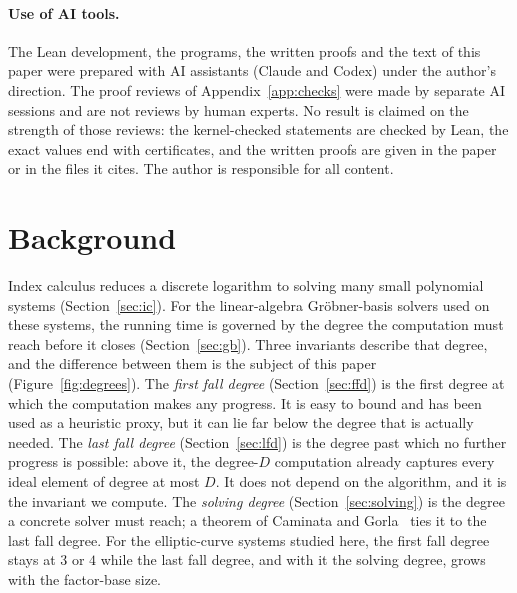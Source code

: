 \documentclass[11pt]{article}
\theoremstyle{definition}\newtheorem{definition}[theorem]{Definition}
\theoremstyle{remark}\newtheorem{remark}[theorem]{Remark}
\begin{document}
\paragraph{Use of AI tools.} The Lean development, the programs, the
written proofs and the text of this paper were prepared with AI assistants
(Claude and Codex) under the author's direction. The proof reviews of
Appendix~\ref{app:checks} were made by separate AI sessions and are not
reviews by human experts. No result is claimed on the strength of those
reviews: the kernel-checked statements are checked by Lean, the exact
values end with certificates, and the written proofs are given in the
paper or in the files it cites. The author is responsible for all content.

\section{Background}\label{sec:background}
Index calculus reduces a discrete logarithm to solving many small
polynomial systems (Section~\ref{sec:ic}). For the linear-algebra
Gr\"obner-basis solvers used on these systems, the running time is governed
by the degree the computation must reach before it closes
(Section~\ref{sec:gb}). Three invariants describe that degree, and the
difference between them is the subject of this paper
(Figure~\ref{fig:degrees}). The \emph{first fall degree}
(Section~\ref{sec:ffd}) is the first degree at which the computation makes
any progress. It is easy to bound and has been used as a heuristic proxy,
but it can lie far below the degree that is actually needed. The \emph{last
fall degree} (Section~\ref{sec:lfd}) is the degree past which no further
progress is possible: above it, the degree-$D$ computation already captures
every ideal element of degree at most $D$. It does not depend on the
algorithm, and it is the invariant we compute. The \emph{solving degree}
(Section~\ref{sec:solving}) is the degree a concrete solver must reach; a
theorem of Caminata and Gorla~\cite{cg} ties it to the last fall degree. For
the elliptic-curve systems studied here, the first fall degree stays at $3$
or $4$ while the last fall degree, and with it the solving degree, grows
with the factor-base size.
\end{document}
